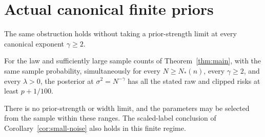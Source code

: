 \section{Actual canonical finite priors}
\label{sec:canonical-finite}
The same obstruction holds without taking a prior-strength limit at every canonical exponent $\gamma\ge2$.

\begin{theorem}
\label{thm:canonical-finite}
For the law and sufficiently large sample counts of Theorem~\ref{thm:main}, with the same sample probability, simultaneously for every $N\ge N_*(n)$, every $\gamma\ge2$, and every $\lambda>0$, the posterior at $\sigma^2=N^{-\gamma}$ has all the stated raw and clipped risks at least $p+1/100$.

There is no prior-strength or width limit, and the parameters may be selected from the sample within these ranges. The scaled-label conclusion of Corollary~\ref{cor:small-noise} also holds in this finite regime.
\end{theorem}
